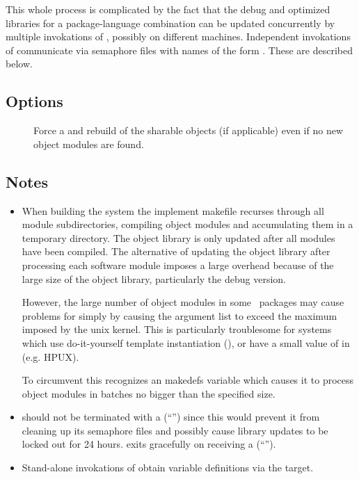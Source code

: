 This whole process is complicated by the fact that the debug and optimized
libraries for a package-language combination can be updated concurrently by
multiple invokations of , possibly on different machines.
Independent invokations of  communicate via semaphore files
with names of the form .  These are described below.

\subsection*{Options}

\begin{description}
\item[]
   Force a  and rebuild of the sharable objects (if
   applicable) even if no new object modules are found.
\end{description}

\subsection*{Notes}

\begin{itemize}
\item
   When building the system the implement makefile recurses through all module
   subdirectories, compiling object modules and accumulating them in a
   temporary directory.  The object library is only updated after all modules
   have been compiled.  The alternative of updating the object library after
   processing each software module imposes a large overhead because of the
   large size of the object library, particularly the debug version.
 
   However, the large number of object modules in some \aipspp\ packages may
   cause problems for  simply by causing the argument list to
   exceed the maximum imposed by the unix kernel.  This is particularly
   troublesome for systems which use do-it-yourself template instantiation 
   (), or have a small value of 
   in  (e.g. HPUX).

   To circumvent this  recognizes an  makedefs
   variable which causes it to process object modules in batches no bigger
   than the specified size.
\item
    should not be terminated with a 
   (``'') since this would prevent it from cleaning up its
   semaphore files and possibly cause library updates to be locked out for 24
   hours.   exits gracefully on receiving a 
   (``'').
\item
   Stand-alone invokations of  obtain  variable
   definitions via the  target.
\end{itemize}

